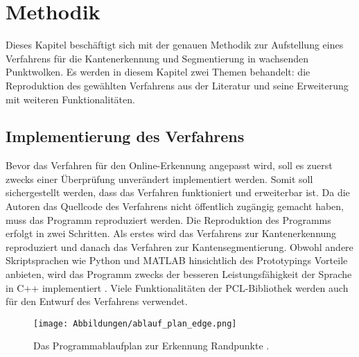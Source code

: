 

\chapter{Methodik} \label{Methodik}
Dieses Kapitel beschäftigt sich mit der genauen Methodik zur Aufstellung eines Verfahrens für die Kantenerkennung und Segmentierung in wachsenden Punktwolken. Es werden in diesem Kapitel zwei Themen behandelt: die Reproduktion des gewählten Verfahrens aus der Literatur und seine Erweiterung mit weiteren Funktionalitäten. 

\section{Implementierung des Verfahrens}
Bevor das Verfahren für den Online-Erkennung angepasst wird, soll es zuerst zwecks einer Überprüfung unverändert implementiert werden. Somit soll sichergestellt werden, dass das Verfahren funktioniert und erweiterbar ist. Da die Autoren das Quellcode des Verfahrens nicht öffentlich zugängig gemacht haben, muss das Programm reproduziert werden. Die Reproduktion des Programms erfolgt in zwei Schritten. Als erstes wird das Verfahrens zur Kantenerkennung reproduziert und danach das Verfahren zur Kantensegmentierung. Obwohl andere Skriptsprachen wie Python und MATLAB hinsichtlich des Prototypings Vorteile anbieten, wird das Programm zwecks der besseren Leistungsfähigkeit der Sprache in C++ implementiert \autocite{svensson_performance_2021}. Viele Funktionalitäten der PCL-Bibliothek \autocite{rusu_3d_2011} werden auch für den Entwurf des Verfahrens verwendet.

\begin{figure}[h]
	\texttt{[image: Abbildungen/ablauf\_plan\_edge.png]}
	\centering
	\caption{Das Programmablaufplan zur Erkennung Randpunkte \autocite{ni_edge_2016}.}
	\label{flow_chart}
\end{figure}

